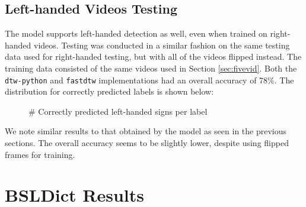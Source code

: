 \documentclass[final,rdr32.tex]{subfiles}
\begin{document}
\subsection{Left-handed Videos Testing}

The model supports left-handed detection as well, even when trained on right-handed videos. Testing was conducted in a similar fashion on the same testing data used for right-handed testing, but with all of the videos flipped instead. The training data consisted of the same videos used in Section \ref{sec:fivevid}. Both the \verb|dtw-python| and \verb|fastdtw| implementations had an overall accuracy of 78\%. The distribution for correctly predicted labels is shown below:

\begin{figure}[H]
    \begin{center}
    \end{center}
    \caption{\# Correctly predicted left-handed signs per label}
    \label{bar:left}
\end{figure}

We note similar results to that obtained by the model as seen in the previous sections. The overall accuracy seems to be slightly lower, despite using flipped frames for training.

\section{BSLDict Results}
\label{sec:bsldictresults}
\end{document}
